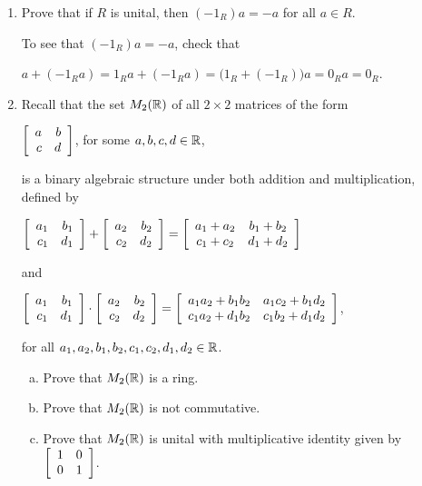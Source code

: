 \documentclass[11pt,fleqn,dvipsnames,usenames]{article}
\begin{document}
\begin{enumerate}[1.]
\item Prove that if $R$ is unital, then $(-1_{R})a = -a$ for all $a\in R$.
\vsmsp

\solution

To see that $(-1_{R})a = -a$, check that
\begin{center}
$a + (-1_{R}a) = 1_{R}a + (-1_{R}a) = \big(1_{R} + (-1_{R})\big)a = 0_{R}a = 0_{R}$.
\end{center}

\item Recall that the set $M_{2}(\R)$ of all $2\times 2$ matrices of the form
\begin{center}
$\MATRIX{rr}{a & b\\c & d}$, for some $a,b,c,d\in\R$,
\end{center}
is a binary algebraic structure under both addition and multiplication, defined by
\begin{center}
$\MATRIX{rr}{a_1 & b_1\\c_1 & d_1} + \MATRIX{rr}{a_2 & b_2\\c_2 & d_2} = \MATRIX{cc}{a_1 + a_2 & b_1 + b_2\\c_1 + c_2& d_1 + d_2}$
\end{center}
and
\begin{center}
$\MATRIX{rr}{a_1 & b_1\\c_1 & d_1}\cdot \MATRIX{rr}{a_2 & b_2\\c_2 & d_2} = \MATRIX{cc}{a_1a_2 + b_1b_2 & a_1c_2 + b_1d_2\\c_1a_2 + d_1b_2 & c_1b_2 + d_1d_2}$,
\end{center}
for all $a_{1},a_{2},b_{1},b_{2},c_{1},c_{2},d_{1},d_{2}\in\R$.
\vsp
\begin{enumerate}[(a)]
\item Prove that $M_{2}(\R)$ is a ring.
\item Prove that $M_{2}(\R)$ is not commutative.
\item Prove that $M_{2}(\R)$ is unital with multiplicative identity given by $\MATRIX{rr}{1 & 0\\0 & 1}$.
\end{enumerate}
\vsmsp


\end{enumerate}
\end{document}
